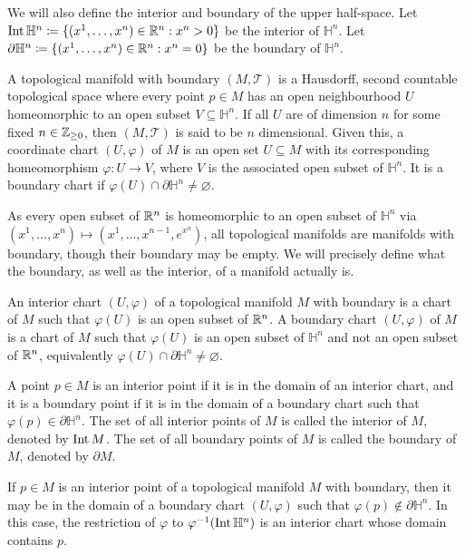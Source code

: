 \documentclass[a4paper,12pt]{article}
\begin{document}
We will also define the interior and boundary of the upper half-space.
Let $\operatorname{Int} \mathbb{H}^n \coloneq \{(x^1, \ldots, x^n) \in \mathbb{R}^n : x^n > 0\}$ be the interior of $\mathbb{H}^n$.
Let $\partial \mathbb{H}^n \coloneq \{(x^1, \ldots, x^n) \in \mathbb{R}^n : x^n = 0\}$ be the boundary of $\mathbb{H}^n$.

\begin{definition}\label{def:topological_manifold_with_boundary}
    A topological manifold with boundary $(M, \mathcal{T})$ is a Hausdorff, second countable topological space where every point $p \in M$ has an open neighbourhood $U$ homeomorphic to an open subset $V \subseteq \mathbb{H}^n$.
    If all $U$ are of dimension $n$ for some fixed $n \in \mathbb{Z}_{\geq 0}$, then $(M, \mathcal{T})$ is said to be $n$ dimensional.
    Given this, a coordinate chart $(U, \varphi)$ of $M$ is an open set $U \subseteq M$ with its corresponding homeomorphism $\varphi \colon U \to V$, where $V$ is the associated open subset of $\mathbb{H}^n$.
    It is a boundary chart if $\varphi(U) \cap \partial \mathbb{H}^n \neq \varnothing$.
\end{definition}
As every open subset of $\mathbb{R}^n$ is homeomorphic to an open subset of $\mathbb{H}^n$ via $(x^1, \ldots, x^n) \mapsto (x^1, \ldots, x^{n-1}, e^{x^n})$, all topological manifolds are manifolds with boundary, though their boundary may be empty.
We will precisely define what the boundary, as well as the interior, of a manifold actually is.
\begin{definition}\label{def:interior_and_boundary}
    An interior chart $(U, \varphi)$ of a topological manifold $M$ with boundary is a chart of $M$ such that $\varphi(U)$ is an open subset of $\mathbb{R}^n$.
    A boundary chart $(U, \varphi)$ of $M$ is a chart of $M$ such that $\varphi(U)$ is an open subset of $\mathbb{H}^n$ and not an open subset of $\mathbb{R}^n$, equivalently $\varphi(U) \cap \partial \mathbb{H}^n \neq \varnothing$.
    
    A point $p \in M$ is an interior point if it is in the domain of an interior chart, and it is a boundary point if it is in the domain of a boundary chart such that $\varphi(p) \in \partial \mathbb{H}^n$.
    The set of all interior points of $M$ is called the interior of $M$, denoted by $\operatorname{Int} M$.
    The set of all boundary points of $M$ is called the boundary of $M$, denoted by $\partial M$.
\end{definition}
\begin{remark}
    If $p \in M$ is an interior point of a topological manifold $M$ with boundary, then it may be in the domain of a boundary chart $(U, \varphi)$ such that $\varphi(p) \notin \partial \mathbb{H}^n$.
    In this case, the restriction of $\varphi$ to $\varphi^{-1}(\operatorname{Int} \mathbb{H}^n)$ is an interior chart whose domain contains $p$.
\end{remark}
\end{document}
